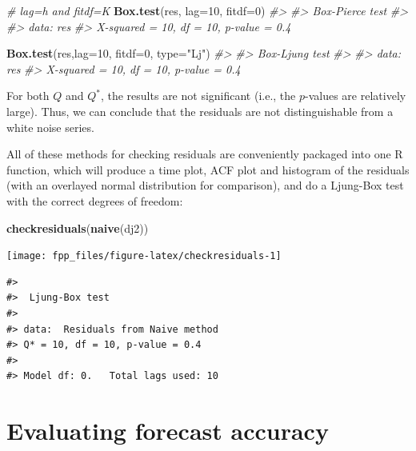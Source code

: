 \documentclass[]{book}
\newenvironment{Shaded}{\begin{snugshade}}{\end{snugshade}}
\newcommand{\CommentTok}[1]{\textcolor[rgb]{0.56,0.35,0.01}{\textit{#1}}}
\newcommand{\DataTypeTok}[1]{\textcolor[rgb]{0.13,0.29,0.53}{#1}}
\newcommand{\DecValTok}[1]{\textcolor[rgb]{0.00,0.00,0.81}{#1}}
\newcommand{\KeywordTok}[1]{\textcolor[rgb]{0.13,0.29,0.53}{\textbf{#1}}}
\newcommand{\NormalTok}[1]{#1}
\newcommand{\StringTok}[1]{\textcolor[rgb]{0.31,0.60,0.02}{#1}}
\begin{document}
\begin{Shaded}
\begin{Highlighting}[]
\CommentTok{# lag=h and fitdf=K}
\KeywordTok{Box.test}\NormalTok{(res, }\DataTypeTok{lag=}\DecValTok{10}\NormalTok{, }\DataTypeTok{fitdf=}\DecValTok{0}\NormalTok{)}
\CommentTok{#> }
\CommentTok{#>  Box-Pierce test}
\CommentTok{#> }
\CommentTok{#> data:  res}
\CommentTok{#> X-squared = 10, df = 10, p-value = 0.4}

\KeywordTok{Box.test}\NormalTok{(res,}\DataTypeTok{lag=}\DecValTok{10}\NormalTok{, }\DataTypeTok{fitdf=}\DecValTok{0}\NormalTok{, }\DataTypeTok{type=}\StringTok{"Lj"}\NormalTok{)}
\CommentTok{#> }
\CommentTok{#>  Box-Ljung test}
\CommentTok{#> }
\CommentTok{#> data:  res}
\CommentTok{#> X-squared = 10, df = 10, p-value = 0.4}
\end{Highlighting}
\end{Shaded}

For both \(Q\) and \(Q^*\), the results are not significant (i.e., the \(p\)-values are relatively large). Thus, we can conclude that the residuals are not distinguishable from a white noise series.

All of these methods for checking residuals are conveniently packaged into one R function, which will produce a time plot, ACF plot and histogram of the residuals (with an overlayed normal distribution for comparison), and do a Ljung-Box test with the correct degrees of freedom:

\begin{Shaded}
\begin{Highlighting}[]
\KeywordTok{checkresiduals}\NormalTok{(}\KeywordTok{naive}\NormalTok{(dj2))}
\end{Highlighting}
\end{Shaded}

\begin{center}\texttt{[image: fpp\_files/figure-latex/checkresiduals-1]} \end{center}

\begin{verbatim}
#> 
#>  Ljung-Box test
#> 
#> data:  Residuals from Naive method
#> Q* = 10, df = 10, p-value = 0.4
#> 
#> Model df: 0.   Total lags used: 10
\end{verbatim}

\hypertarget{accuracy}{%
\section{Evaluating forecast accuracy}\label{accuracy}}
\end{document}
